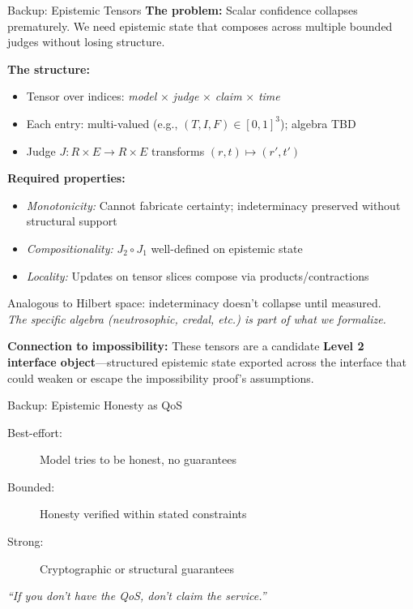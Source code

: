\documentclass[aspectratio=169,11pt]{beamer}
\begin{document}
\appendix

\begin{frame}{Backup: Epistemic Tensors}
    \small
    \textbf{The problem:} Scalar confidence collapses prematurely. We need epistemic state that composes across multiple bounded judges without losing structure.

    \vspace{0.5em}
    \textbf{The structure:}
    \begin{itemize}
        \item Tensor over indices: \textit{model} $\times$ \textit{judge} $\times$ \textit{claim} $\times$ \textit{time}
        \item Each entry: multi-valued (e.g., $(T, I, F) \in [0,1]^3$); algebra TBD
        \item Judge $J: R \times E \to R \times E$ transforms $(r, t) \mapsto (r', t')$
    \end{itemize}

    \vspace{0.5em}
    \textbf{Required properties:}
    \begin{itemize}
        \item \textit{Monotonicity:} Cannot fabricate certainty; indeterminacy preserved without structural support
        \item \textit{Compositionality:} $J_2 \circ J_1$ well-defined on epistemic state
        \item \textit{Locality:} Updates on tensor slices compose via products/contractions
    \end{itemize}

    \vspace{0.5em}
    Analogous to Hilbert space: indeterminacy doesn't collapse until measured.\\
    \textit{The specific algebra (neutrosophic, credal, etc.) is part of what we formalize.}

    \vspace{0.5em}
    \textbf{Connection to impossibility:} These tensors are a candidate \textbf{Level 2 interface object}---structured epistemic state exported across the interface that could weaken or escape the impossibility proof's assumptions.
\end{frame}

\begin{frame}{Backup: Epistemic Honesty as QoS}
    \begin{description}
        \item[Best-effort:] Model tries to be honest, no guarantees
        \item[Bounded:] Honesty verified within stated constraints
        \item[Strong:] Cryptographic or structural guarantees
    \end{description}

    \vspace{1em}
    \textit{``If you don't have the QoS, don't claim the service.''}
\end{frame}
\end{document}
